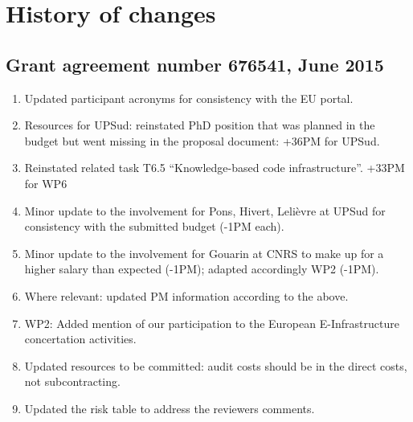 \section*{History of changes}

\subsection*{Grant agreement number 676541, June 2015}
\thispagestyle{empty}

\begin{enumerate}
\item Updated participant acronyms for consistency with the EU portal.

\item Resources for UPSud: reinstated PhD position that was planned in
  the budget but went missing in the proposal document: +36PM for UPSud.
\item Reinstated related task T6.5 ``Knowledge-based code infrastructure''.
  +33PM for WP6
\item Minor update to the involvement for Pons, Hivert, Lelièvre at
  UPSud for consistency with the submitted budget (-1PM each).
\item Minor update to the involvement for Gouarin at CNRS to make up
  for a higher salary than expected (-1PM); adapted accordingly WP2
  (-1PM).
\item Where relevant: updated PM information according to the above.

\item WP2: Added mention of our participation to the European
  E-Infrastructure concertation activities.

\item Updated resources to be committed: audit costs should be in the
  direct costs, not subcontracting.

\item Updated the risk table to address the reviewers comments.


\end{enumerate}
